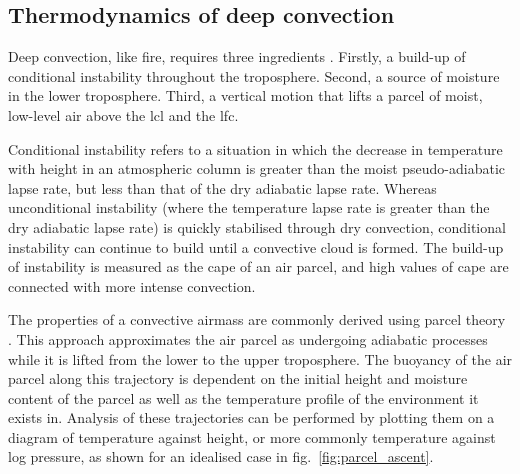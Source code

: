 \subsection{Thermodynamics of deep convection}

Deep convection, like fire, requires three ingredients \citep{brooks_century_2019}. 
Firstly, a build-up of conditional instability throughout the troposphere. 
Second, a source of moisture in the lower troposphere. 
Third, a vertical motion that lifts a parcel of moist, low-level air above the \acrfull{lcl} and the \acrfull{lfc}.

Conditional instability refers to a situation in which the decrease in temperature with height in an atmospheric column is greater than the moist pseudo-adiabatic lapse rate, but less than that of the dry adiabatic lapse rate. 
Whereas unconditional instability (where the temperature lapse rate is greater than the dry adiabatic lapse rate) is quickly stabilised through dry convection, conditional instability can continue to build until a convective cloud is formed. 
The build-up of instability is measured as the \acrfull{cape} of an air parcel, and high values of \acrshort{cape} are connected with more intense convection.

The properties of a convective airmass are commonly derived using parcel theory \citep{stull_practical_2016}. 
This approach approximates the air parcel as undergoing adiabatic processes while it is lifted from the lower to the upper troposphere. 
The buoyancy of the air parcel along this trajectory is dependent on the initial height and moisture content of the parcel as well as the temperature profile of the environment it exists in. 
Analysis of these trajectories can be performed by plotting them on a diagram of temperature against height, or more commonly temperature against log pressure, as shown for an idealised case in fig.~\ref{fig:parcel_ascent}.

